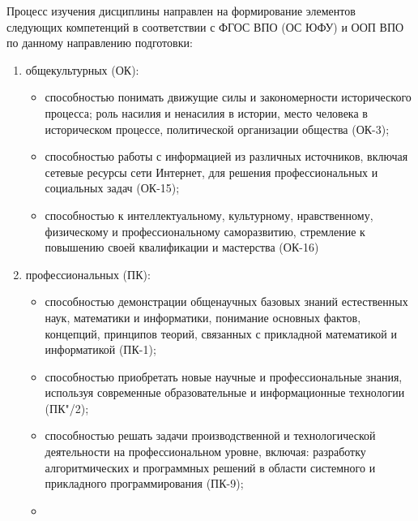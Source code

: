 	\ssect
Процесс изучения дисциплины направлен на формирование элементов следующих компетенций в соответствии с ФГОС ВПО (ОС ЮФУ) и ООП ВПО по данному направлению подготовки:
\begin{enumerate}
\rusitems %
	\item общекультурных (ОК):
	\begin{itemize}
		\item способностью понимать движущие силы и закономерности исторического процесса; роль насилия и ненасилия в истории, место человека в историческом процессе, политической организации общества (ОК-3);
		\item способностью работы с информацией из различных источников, включая сетевые ресурсы сети Интернет, для решения профессиональных и социальных задач (ОК-15);
		\item способностью к интеллектуальному, культурному, нравственному, физическому и профессиональному саморазвитию, стремление к повышению своей квалификации и мастерства (ОК-16)
	\end{itemize}

	\item профессиональных (ПК):
	\begin{itemize}
		\item способностью демонстрации общенаучных базовых знаний естественных наук, математики и информатики, понимание основных фактов, концепций, принципов теорий, связанных с прикладной математикой и информатикой (ПК-1);
		\item способностью приобретать новые научные и профессиональные знания, используя современные образовательные и информационные технологии (ПК"/2);
		\item способностью решать задачи производственной и технологической деятельности на профессиональном уровне, включая: разработку алгоритмических и программных решений в области системного и прикладного программирования (ПК-9);
		\item 
	\end{itemize}
\end{enumerate}

